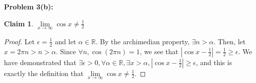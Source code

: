 \documentclass{article}
\newcommand{\reals}{\ensuremath{\mathbb{R}}}
\newcommand{\eps}{\ensuremath{\epsilon}}
\newcommand{\limf}[1]{\ensuremath{\underset{x\to #1 }{\lim}}}
\newtheorem{clm}{Claim}
\begin{document}
\textbf{Problem 3(b):}

\begin{clm}
	$\limf{\infty} \cos x \neq \frac{1}{2}$
\end{clm}

\begin{proof}
	Let $\eps = \frac{1}{2}$ and let $\alpha \in \reals$.
	By the archimedian property,
	$\exists n > \alpha$.
	Then, let $x = 2\pi n > n > \alpha$.
	Since $\forall n, \cos (2\pi n) = 1$,
	we see that  $|\cos x - \frac{1}{2}| = \frac{1}{2} \geq \eps$.
	We have demonstrated that
	$\exists \eps > 0,
	\forall \alpha \in \reals,
	\exists x > \alpha,
	|\cos x - \frac{1}{2}| \geq \eps$,
	and this is exactly the definition that
	$\limf{\infty} \cos x \neq \frac{1}{2}$.
\end{proof}
\end{document}
